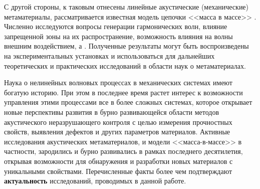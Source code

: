 С другой стороны, к таковым отнесены линейные акустические (механические) метаматериалы, рассматривается известная модель цепочки <<масса в массе>> \cite{Huang2009}. Численно исследуются вопросы генерации гармонических волн, влияние запрещенной зоны на их распространение, возможность влияния на волны внешним воздействием, а . Полученные результаты могут быть воспроизведены на экспериментальных установках и использоваться для дальнейших теоретических и практических исследований в области наук о метаматериалах.

{\actuality} Наука о нелинейных волновых процессах в механических системах имеют богатую историю. При этом в последнее время растет интерес к возможности управления этими процессами все в более сложных системах, которое открывает новые перспективы развития в бурно развивающейся области методов акустического неразрушающего контроля с целью измерения прочностных свойств, выявления дефектов и других параметров материалов. Активные исследования акустических метаматериалов, и модели <<масса-в-массе>> в частности, зародились и бурно развивались в рамках последнего десятилетия, открывая возможности для обнаружения и разработки новых материалов с уникальными свойствами. Перечисленные факты более чем подтверждают \textbf{актуальность} исследований, проводимых в данной работе.



